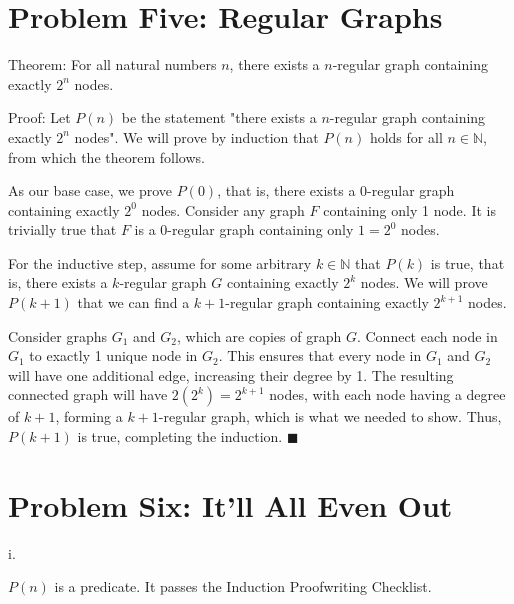 \documentclass{article}
\renewcommand{\(}{\left(}
\renewcommand{\)}{\right)}
\renewcommand\qedsymbol{$\blacksquare$}
\theoremstyle{plain}
\theoremstyle{plain}
\theoremstyle{definition}
\begin{document}
\newpage

\section*{Problem Five: Regular Graphs}
\begin{shaded}
    Theorem: For all natural numbers $n$, there exists a $n$-regular graph containing exactly $2^{n}$ nodes.

    \vspace{4mm}

    Proof: Let $P(n)$ be the statement "there exists a $n$-regular graph containing exactly $2^{n}$ nodes". We will prove by induction that $P(n)$ holds for all $n\in\mathbb{N}$, from which the theorem follows.

    \vspace{4mm}

    As our base case, we prove $P(0)$, that is, there exists a $0$-regular graph containing exactly $2^{0}$ nodes. Consider any graph $F$ containing only 1 node. It is trivially true that $F$ is a $0$-regular graph containing only $1=2^{0}$ nodes.

    \vspace{4mm}

    For the inductive step, assume for some arbitrary $k\in\mathbb{N}$ that $P(k)$ is true, that is, there exists a $k$-regular graph $G$ containing exactly $2^{k}$ nodes. We will prove $P(k+1)$ that we can find a $k+1$-regular graph containing exactly $2^{k+1}$ nodes.

    \vspace{4mm}

    Consider graphs $G_{1}$ and $G_{2}$, which are copies of graph $G$. Connect each node in $G_{1}$ to exactly 1 unique node in $G_{2}$. This ensures that every node in $G_{1}$ and $G_{2}$ will have one additional edge, increasing their degree by 1. The resulting connected graph will have $2(2^{k})=2^{k+1}$ nodes, with each node having a degree of $k+1$, forming a $k+1$-regular graph, which is what we needed to show. Thus, $P(k+1)$ is true, completing the induction.        \qedsymbol
\end{shaded}

\newpage

\section*{Problem Six: It'll All Even Out}
    i.
    \begin{shaded}
        $P(n)$ is a predicate. It passes the Induction Proofwriting Checklist.

    \end{shaded}
    
\end{document}
